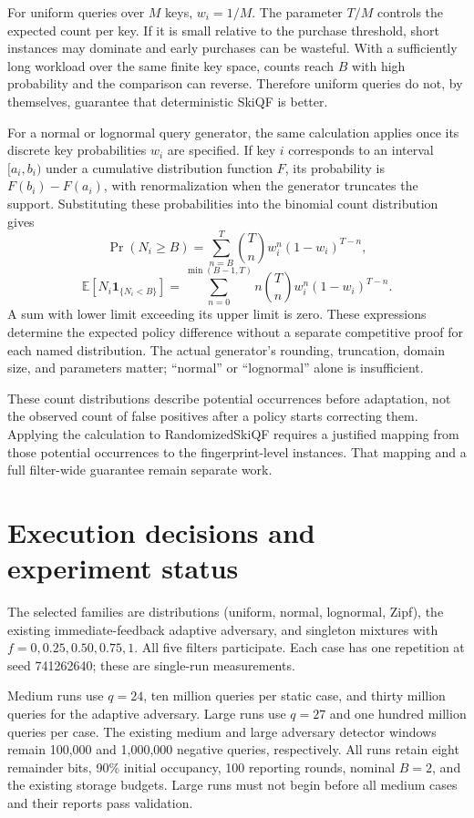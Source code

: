 \documentclass[11pt]{article}
\begin{document}
For uniform queries over $M$ keys, $w_i=1/M$. The parameter $T/M$ controls the expected count per key. If it is small relative to the purchase threshold, short instances may dominate and early purchases can be wasteful. With a sufficiently long workload over the same finite key space, counts reach $B$ with high probability and the comparison can reverse. Therefore uniform queries do not, by themselves, guarantee that deterministic SkiQF is better.

For a normal or lognormal query generator, the same calculation applies once its discrete key probabilities $w_i$ are specified. If key $i$ corresponds to an interval $[a_i,b_i)$ under a cumulative distribution function $F$, its probability is $F(b_i)-F(a_i)$, with renormalization when the generator truncates the support. Substituting these probabilities into the binomial count distribution gives
\[
\Pr(N_i\ge B)=\sum_{n=B}^T\binom{T}{n}w_i^n(1-w_i)^{T-n},
\]
\[
\mathbb E[N_i\mathbf1_{\{N_i<B\}}]
=\sum_{n=0}^{\min(B-1,T)}n\binom{T}{n}w_i^n(1-w_i)^{T-n}.
\]
A sum with lower limit exceeding its upper limit is zero. These expressions determine the expected policy difference without a separate competitive proof for each named distribution. The actual generator's rounding, truncation, domain size, and parameters matter; ``normal'' or ``lognormal'' alone is insufficient.

These count distributions describe potential occurrences before adaptation, not the observed count of false positives after a policy starts correcting them. Applying the calculation to RandomizedSkiQF requires a justified mapping from those potential occurrences to the fingerprint-level instances. That mapping and a full filter-wide guarantee remain separate work.

\section{Execution decisions and experiment status}
The selected families are distributions (uniform, normal, lognormal, Zipf), the existing immediate-feedback adaptive adversary, and singleton mixtures with $f=0,0.25,0.50,0.75,1$. All five filters participate. Each case has one repetition at seed 741262640; these are single-run measurements.

Medium runs use $q=24$, ten million queries per static case, and thirty million queries for the adaptive adversary. Large runs use $q=27$ and one hundred million queries per case. The existing medium and large adversary detector windows remain 100,000 and 1,000,000 negative queries, respectively. All runs retain eight remainder bits, 90\% initial occupancy, 100 reporting rounds, nominal $B=2$, and the existing storage budgets. Large runs must not begin before all medium cases and their reports pass validation.
\end{document}
